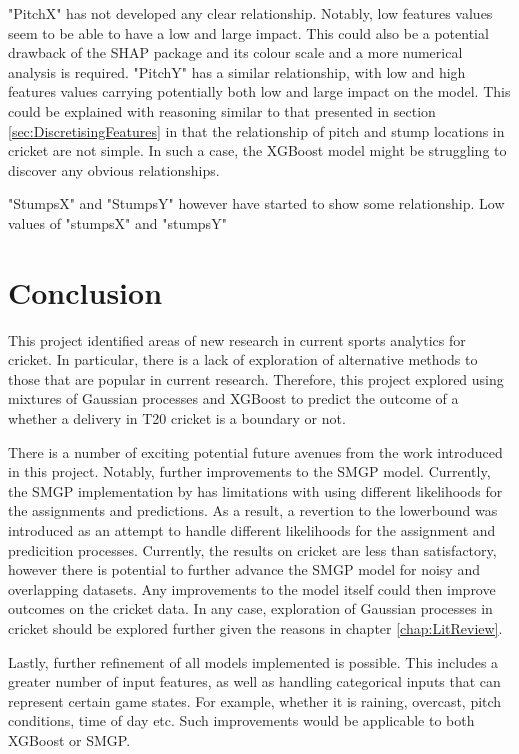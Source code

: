 \documentclass[12pt,a4paper]{report}
\theoremstyle{definition}
\begin{document}
"PitchX" has not developed any clear relationship. 
Notably, low features values seem to be able to have a low and large impact.
This could also be a potential drawback of the SHAP package and its colour scale and a more numerical analysis is required.
"PitchY" has a similar relationship, with low and high features values carrying potentially both low and large impact on the model.
This could be explained with reasoning similar to that presented in section \ref{sec:DiscretisingFeatures} in that the relationship of pitch and stump locations in cricket are not simple.
In such a case, the XGBoost model might be struggling to discover any obvious relationships.

"StumpsX" and "StumpsY" however have started to show some relationship.
Low values of "stumpsX" and "stumpsY"

\chapter{Conclusion}

This project identified areas of new research in current sports analytics for cricket.
In particular, there is a lack of exploration of alternative methods to those that are popular in current research.
Therefore, this project explored using mixtures of Gaussian processes and XGBoost to predict the outcome of a whether a delivery in T20 cricket is a boundary or not.

There is a number of exciting potential future avenues from the work introduced in this project.
Notably, further improvements to the SMGP model.
Currently, the SMGP implementation by \citet{Lui2020} has limitations with using different likelihoods for the assignments and predictions.
As a result, a revertion to the \citet{Kaiser2018} lowerbound was introduced as an attempt to handle different likelihoods for the assignment and predicition processes.
Currently, the results on cricket are less than satisfactory, however there is potential to further advance the SMGP model for noisy and overlapping datasets.
Any improvements to the model itself could then improve outcomes on the cricket data.
In any case, exploration of Gaussian processes in cricket should be explored further given the reasons in chapter \ref{chap:LitReview}.

Lastly, further refinement of all models implemented is possible. 
This includes a greater number of input features, as well as handling categorical inputs that can represent certain game states.
For example, whether it is raining, overcast, pitch conditions, time of day etc.
Such improvements would be applicable to both XGBoost or SMGP.
\end{document}
